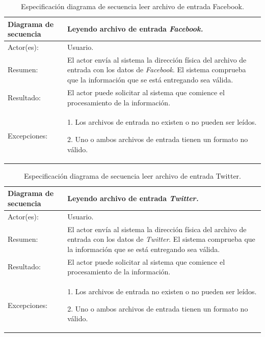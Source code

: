 \begin{table}[H]
\begin{center}
\caption[Especificación diagrama de secuencia leer archivo de entrada Facebook.]{Especificación diagrama de secuencia leer archivo de entrada Facebook.}
\label{tab:des-tab13}
\begin{tabular}{|l|>{\raggedright}p{7cm}|}
\hline 
Diagrama de secuencia & Leyendo archivo de entrada \emph{Facebook.}\tabularnewline
\hline 
\hline 
Actor(es): & Usuario.\tabularnewline
\hline 
Resumen: & El actor envía al sistema la dirección física del archivo de entrada
con los datos de \emph{Facebook}. El sistema comprueba que la información
que se está entregando sea válida.\tabularnewline
\hline 
Resultado: & El actor puede solicitar al sistema que comience el procesamiento
de la información.\tabularnewline
\hline 
Excepciones: & 1. Los archivos de entrada no existen o no pueden ser leídos. 

2. Uno o ambos archivos de entrada tienen un formato no válido. \tabularnewline
\hline 
\end{tabular}
\end{center}
\end{table}


\begin{table}[H]
\begin{center}
\caption[Especificación diagrama de secuencia leer archivo de entrada Twitter.]{Especificación diagrama de secuencia leer archivo de entrada Twitter.}
\label{tab:des-tab14}
\begin{tabular}{|l|>{\raggedright}p{7cm}|}
\hline 
Diagrama de secuencia & Leyendo archivo de entrada \emph{Twitter.}\tabularnewline
\hline 
\hline 
Actor(es): & Usuario.\tabularnewline
\hline 
Resumen: & El actor envía al sistema la dirección física del archivo de entrada
con los datos de \emph{Twitter}. El sistema comprueba que la información
que se está entregando sea válida.\tabularnewline
\hline 
Resultado: & El actor puede solicitar al sistema que comience el procesamiento
de la información.\tabularnewline
\hline 
Excepciones: & 1. Los archivos de entrada no existen o no pueden ser leídos. 

2. Uno o ambos archivos de entrada tienen un formato no válido. \tabularnewline
\hline 
\end{tabular}
\end{center}
\end{table}


